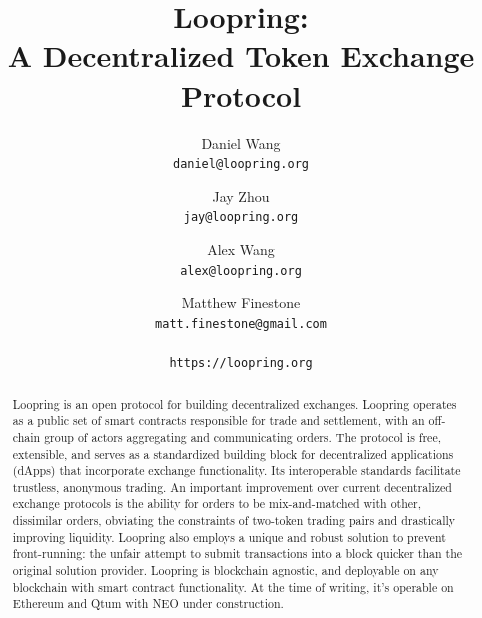 \documentclass[UTF8,nofonts]{article}
\title{\textbf{Loopring:}\\\textbf{A Decentralized Token Exchange Protocol}}
\author{
  Daniel Wang\\
  \texttt{daniel@loopring.org}\\
  \and
  	Jay Zhou\\
  	\texttt{jay@loopring.org}\\
  	\and
  	Alex Wang\\
  	\texttt{alex@loopring.org}\\
  	\and
  	Matthew Finestone\\
  	\texttt{matt.finestone@gmail.com}\\ 
  \\
  \texttt{https://loopring.org}
 }
\begin{document}
\maketitle


\begin{abstract}
Loopring is an open protocol for building decentralized exchanges. Loopring operates as a public set of smart contracts responsible for trade and settlement, with an off-chain group of actors aggregating and communicating orders. The protocol is free, extensible, and serves as a standardized building block for decentralized applications (dApps) that incorporate exchange functionality. Its interoperable standards facilitate trustless, anonymous trading. An important improvement over current decentralized exchange protocols is the ability for orders to be mix-and-matched with other, dissimilar orders, obviating the constraints of two-token trading pairs and drastically improving liquidity. Loopring also employs a unique and robust solution to prevent front-running: the unfair attempt to submit transactions into a block quicker than the original solution provider. Loopring is blockchain agnostic, and deployable on any blockchain with smart contract functionality. At the time of writing, it's operable on Ethereum \cite{buterin2017ethereum} \cite{wood2014ethereum} and Qtum \cite{dai2017smart} with NEO \cite{atterlonn2018distributed} under construction.
\end{abstract}
\end{document}
